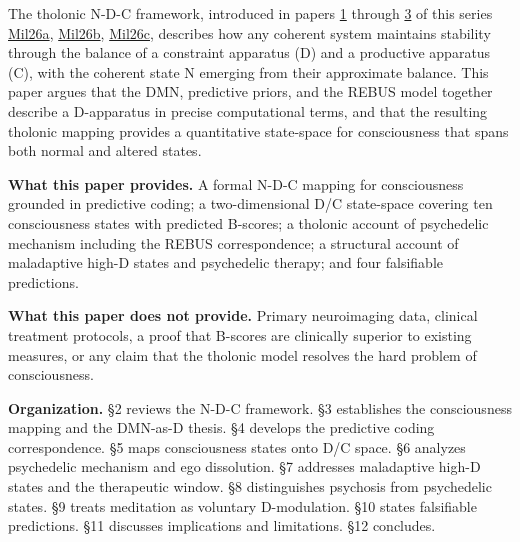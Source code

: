 \documentclass[
  11pt,
  letterpaper,
]{article}
\begin{document}
The tholonic N-D-C framework, introduced in papers
\href{https://github.com/baardev/truevalue/blob/main/docnav/Research/papers/1_recursive-tholonic-five-constants/1_recursive-tholonic-five-constants.pdf}{1}
through
\href{https://github.com/baardev/truevalue/blob/main/docnav/Research/papers/3_minimal-recursive-triadic-framework/3_minimal-recursive-triadic-framework.pdf}{3}
of this series
\href{https://github.com/baardev/truevalue/blob/main/docnav/Research/papers/1_recursive-tholonic-five-constants/1_recursive-tholonic-five-constants.pdf}{Mil26a},
\href{https://github.com/baardev/truevalue/blob/main/docnav/Research/papers/2_supply-chain-transparency-tvpci/2_supply-chain-transparency-tvpci.pdf}{Mil26b},
\href{https://github.com/baardev/truevalue/blob/main/docnav/Research/papers/3_minimal-recursive-triadic-framework/3_minimal-recursive-triadic-framework.pdf}{Mil26c},
describes how any coherent system maintains stability through the
balance of a constraint apparatus (D) and a productive apparatus (C),
with the coherent state N emerging from their approximate balance. This
paper argues that the DMN, predictive priors, and the REBUS model
together describe a D-apparatus in precise computational terms, and that
the resulting tholonic mapping provides a quantitative state-space for
consciousness that spans both normal and altered states.

\textbf{What this paper provides.} A formal N-D-C mapping for
consciousness grounded in predictive coding; a two-dimensional D/C
state-space covering ten consciousness states with predicted B-scores; a
tholonic account of psychedelic mechanism including the REBUS
correspondence; a structural account of maladaptive high-D states and
psychedelic therapy; and four falsifiable predictions.

\textbf{What this paper does not provide.} Primary neuroimaging data,
clinical treatment protocols, a proof that B-scores are clinically
superior to existing measures, or any claim that the tholonic model
resolves the hard problem of consciousness.

\textbf{Organization.} §2 reviews the N-D-C framework. §3 establishes
the consciousness mapping and the DMN-as-D thesis. §4 develops the
predictive coding correspondence. §5 maps consciousness states onto D/C
space. §6 analyzes psychedelic mechanism and ego dissolution. §7
addresses maladaptive high-D states and the therapeutic window. §8
distinguishes psychosis from psychedelic states. §9 treats meditation as
voluntary D-modulation. §10 states falsifiable predictions. §11
discusses implications and limitations. §12 concludes.
\end{document}
